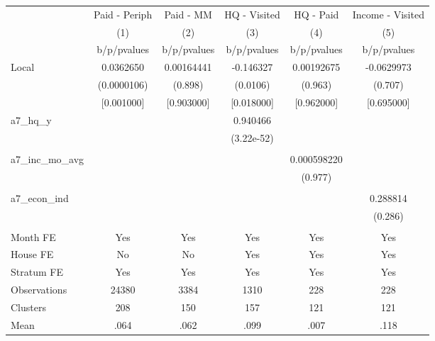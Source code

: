 {
\def\sym#1{\ifmmode^{#1}\else\(^{#1}\)\fi}
\begin{tabular}{l*{5}{c}}
\toprule
                &\multicolumn{1}{c}{Paid - Periph}&\multicolumn{1}{c}{Paid - MM}&\multicolumn{1}{c}{HQ - Visited}&\multicolumn{1}{c}{HQ - Paid}&\multicolumn{1}{c}{Income - Visited}\\
                &\multicolumn{1}{c}{(1)}&\multicolumn{1}{c}{(2)}&\multicolumn{1}{c}{(3)}&\multicolumn{1}{c}{(4)}&\multicolumn{1}{c}{(5)}\\
                &b/p/pvalues&b/p/pvalues&b/p/pvalues&b/p/pvalues&b/p/pvalues\\
\midrule
Local           &0.0362650&0.00164441&-0.146327&0.00192675&-0.0629973\\
                &(0.0000106)&  (0.898)& (0.0106)&  (0.963)&  (0.707)\\
                &[0.001000]&[0.903000]&[0.018000]&[0.962000]&[0.695000]\\
a7\_hq\_y         &         &         & 0.940466&         &         \\
                &         &         &(3.22e-52)&         &         \\
                &         &         &         &         &         \\
a7\_inc\_mo\_avg   &         &         &         &0.000598220&         \\
                &         &         &         &  (0.977)&         \\
                &         &         &         &         &         \\
a7\_econ\_ind     &         &         &         &         & 0.288814\\
                &         &         &         &         &  (0.286)\\
                &         &         &         &         &         \\
Month FE        &      Yes&      Yes&      Yes&      Yes&      Yes\\
House FE        &       No&       No&      Yes&      Yes&      Yes\\
Stratum FE      &      Yes&      Yes&      Yes&      Yes&      Yes\\
\midrule
Observations    &    24380&     3384&     1310&      228&      228\\
Clusters        &      208&      150&      157&      121&      121\\
Mean            &     .064&     .062&     .099&     .007&     .118\\
\bottomrule
\end{tabular}
}
